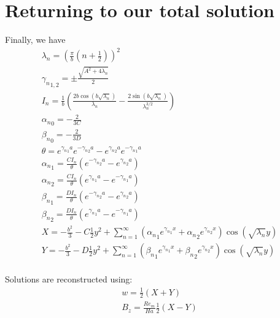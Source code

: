 \documentclass[11pt]{article}
\begin{document}
\section{Returning to our total solution}
Finally, we have
\begin{equation}\begin{aligned}
\lambda_n  = \left(\frac{\pi}{b} \left( n+\frac{1}{2} \right) \right)^2 \\
{\gamma_n}_{1,2} = \pm \frac{\sqrt{A^2 + 4 \lambda_n}}{2} \\
I_{n} = \frac{1}{b} \left( \frac{2 b \cos{ \left( b \sqrt{\lambda_n} \right) }}{\lambda_n}-\frac{2 \sin{ \left( b \sqrt{\lambda_n} \right) }}{\lambda_n^{3/2}} \right) \\
{\alpha_n}_0 = -\frac{2}{3 C} \\
{\beta_n}_0  = -\frac{2}{3 D} \\
\theta = e^{ {\gamma_n}_1 a} e^{-{\gamma_n}_2 a} - e^{ {\gamma_n}_2 a} e^{-{\gamma_n}_1 a} \\
{\alpha_n}_1 = \frac{C I_n}{\theta} (e^{-{\gamma_n}_2 a} - e^{ {\gamma_n}_2 a}) \\
{\alpha_n}_2 = \frac{C I_n}{\theta} (e^{ {\gamma_n}_1 a} - e^{-{\gamma_n}_1 a}) \\
{\beta_n}_1  = \frac{D I_n}{\theta} (e^{-{\gamma_n}_2 a} - e^{ {\gamma_n}_2 a}) \\
{\beta_n}_2  = \frac{D I_n}{\theta} (e^{ {\gamma_n}_1 a} - e^{-{\gamma_n}_1 a}) \\
X = -\frac{b^2}{3} - C \frac{1}{2} y^2 + \sum_{n=1}^{\infty} \left( {\alpha_n}_1 e^{{\gamma_n}_1 x} + {\alpha_n}_2 e^{{\gamma_n}_2 x} \right) \cos(\sqrt{\lambda_n} y) \\
Y = -\frac{b^2}{3} - D \frac{1}{2} y^2 + \sum_{n=1}^{\infty} \left( {\beta_n}_1  e^{{\gamma_n}_1 x} + {\beta_n}_2  e^{{\gamma_n}_2 x} \right) \cos(\sqrt{\lambda_n} y) \\
\end{aligned} \end{equation}

Solutions are reconstructed using:
\begin{equation}\begin{aligned}
w   =                 \frac{1}{2} (X + Y)\\
B_z = \frac{Re_m}{Ha} \frac{1}{2} (X - Y)\\
\end{aligned} \end{equation}
\end{document}
